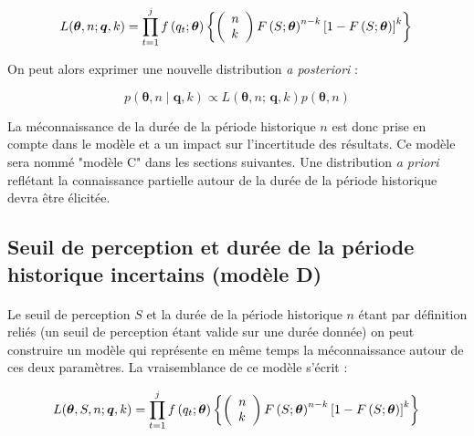 				\begin{equation}
				L(\boldsymbol{\theta}, n ; \boldsymbol{q}, k) = \prod_{t=1}^j f\left(q_t;\boldsymbol{\theta}\right) \left\{\left(\begin{array}{l}
				n \\
				k
				\end{array}\right) F\left(S;\boldsymbol{\theta}\right)^{n-k}\left[1-F\left(S;\boldsymbol{\theta}\right)\right]^k\right\} \\
				\label{eq:Gev_Binom_uN}
				\end{equation}
				
		On peut alors exprimer une nouvelle distribution \textit{a posteriori} :
		
				\begin{equation}
					p(\boldsymbol{\theta}, n \mid \boldsymbol{q},k) \propto L(\boldsymbol{\theta},n;\,\boldsymbol{q},k) p(\boldsymbol{\theta},n)
					\label{eq:Bayes_uN}
				\end{equation}
			
		La méconnaissance de la durée de la période historique $n$ est donc prise en compte dans le modèle et a un impact sur l'incertitude des résultats. Ce modèle sera nommé "modèle C" dans les sections suivantes. Une distribution \textit{a priori} reflétant la connaissance partielle autour de la durée de la période historique devra être élicitée. 
	
	\subsection{Seuil de perception et durée de la période historique incertains (modèle D)}
	\label{subsec:modD}	
	
	\paragraph{}
	Le seuil de perception $S$ et la durée de la période historique $n$ étant par définition reliés (un seuil de perception étant valide sur une durée donnée) on peut construire un modèle qui représente en même temps la méconnaissance autour de ces deux paramètres. La vraisemblance de ce modèle s'écrit :  
	
					\begin{equation}
			L(\boldsymbol{\theta}, S, n ; \boldsymbol{q}, k) = \prod_{t=1}^j f\left(q_t;\boldsymbol{\theta}\right) \left\{\left(\begin{array}{l}
			n \\
			k
			\end{array}\right) F\left(S;\boldsymbol{\theta}\right)^{n-k}\left[1-F\left(S;\boldsymbol{\theta}\right)\right]^k\right\} \\
			\label{eq:Gev_Binom_SN}
			\end{equation}
		
